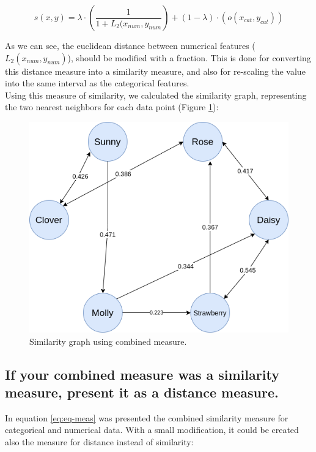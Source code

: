 \documentclass[12pt]{article}
\begin{document}
\begin{equation}
    s(x, y) = \lambda \cdot (\frac{1}{1 + L_2(x_{num}, y_{num}}) + (1-\lambda)\cdot(o(x_{cat}, y_{cat}))
    \label{eq:eq-meas}
\end{equation}

As we can see, the euclidean distance between numerical features ($L_2(x_{num}, y_{num})$), should be modified with a fraction. This is done for converting this distance measure into a similarity measure, and also for re-scaling the value into the same interval as the categorical features. \\

Using this measure of similarity, we calculated the similarity graph, representing the two nearest neighbors for each data point (Figure \ref{fig:combined-graph}):

\begin{figure}[h]
    \centering
    \includegraphics[scale=0.3]{assignment-1/plots/task-4/task-4-a-4.png}
    \caption{Similarity graph using combined measure.}
    \label{fig:combined-graph}
\end{figure}


\subsection{ If your combined measure was a similarity measure, present it as a distance measure.}

In equation \ref{eq:eq-meas} was presented the combined similarity measure for categorical and numerical data. With a small modification, it could be created also the measure for distance instead of similarity:
\end{document}
